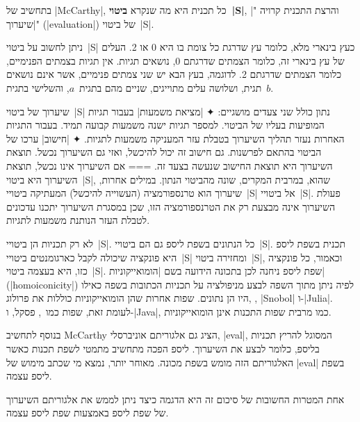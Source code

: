 בתחשיב של \E|McCarthy|, כל תכנית היא מה שנקרא \textbf{ביטוי~\E|S|}, והרצת
התכנית קרויה "\ע|שיערוך|" (\E|evaluation|) של ביטוי~\E|S|. 

ניתן לחשוב על ביטוי~\E|S| כעץ בינארי מלא, כלומר עץ שדרגת כל צומת בו היא 0 או 2.
העלים של עץ בינארי זה, כלומר הצמתים שדרגתם 0, נושאים תגיות. אין תגיות בצמתים
הפנימיים, כלומר הצמתים שדרגתם 2. לדוגמה, בעץ הבא יש שני צמתים פנימיים, אשר אינם
נושאים תגית,  ושלושה עלים
מתוייגים, שניים מהם
בתגית~$a$, והשלישי בתגית~$b$.
\begin{quote}
  \center
\end{quote}

שיערוך של ביטוי~\E|S| נתון כולל שני צעדים מושגיים:
✦ \ע|מציאת משמעות| בעבור תגיות המופיעות בעליו של הביטוי. למספר תגיות ישנה
משמעות קבועה תמיד. בעבור התגיות האחרות נעזר תהליך השיערוך בטבלת עזר המעניקה
משמעות לתגיות.
✦ \ע|חישוב| ערכו של הביטוי בהתאם לפרשנות. גם חישוב זה יכול להיכשל, ואזי גם
השיערוך נכשל. תוצאת השיערוך היא תוצאת החישוב שנעשה בצעד זה.
===
אם השיערוך אינו נכשל, תוצאת השיערוך היא ביטוי~\E|S|, שהוא, במרבית המקרים, שונה
מהביטוי הנתון. במילים אחרות, שיערוך הוא טרנספורמציה (העשוייה להיכשל) המעתיקה
ביטויי~\E|S| אל ביטויי~\E|S|. פעולת השיערוך אינה מבצעת רק את הטרנספורמציה הזו,
שכן במסגרת השיערוך יתכנו עדכונים לטבלת העזר הנותנת משמעות לתגיות.

לא רק תכניות הן ביטויי~\E|S|. כל הנתונים בשפת ליספ גם הם ביטויי~\E|S|. תכנית
בשפת ליספ היא פונקציה שיכולה לקבל כארגומנטים ביטויי~\E|S| ומחזירה ביטוי~\E|S|,
וכאמור, כל פונקציה כזו, היא בעצמה ביטוי~\E|S|. שפת ליספ ניחנה לכן בתכונה הידועה
בשם \ע|הומואייקוניות| (\E|homoiconicity|) לפיה ניתן מתוך השפה לבצע מניפולציה על
תכניות הכתובות בשפה כאילו היו הן נתונים. שפות אחרות שהן הומואייקוניות כוללות את
פרולוג, , \E|Snobol| ו-\E|Julia|. לעומת זאת, שפות
כמו~\CPL, פסקל, ו-\E|Java|, כמו מרבית שפות התכנות אינן הומואייקוניות.

בנוסף לתחשיב McCarthy הציג גם אלגוריתם אוניברסלי, \E|eval|, המסוגל להריץ תכניות
בליספ, כלומר לבצע את השיערוך. ליספ הפכה מתחשיב מתמטי לשפת תכנות כאשר האלגוריתם
הזה מומש בשפת מכונה. מאוחר יותר, נמצא מי שכתב מימוש של \E|eval| בשפת ליספ עצמה.

אחת המטרות החשובות של סיכום זה היא הדגמה כיצד ניתן לממש את אלגוריתם השיערוך של
שפת ליספ באמצעות שפת ליספ עצמה.

